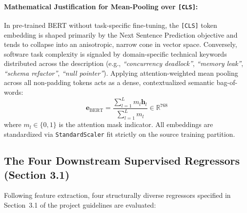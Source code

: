 \documentclass[11pt,a4paper]{article}
\begin{document}
\paragraph{Mathematical Justification for Mean-Pooling over \texttt{[CLS]}:}
In pre-trained BERT without task-specific fine-tuning, the \texttt{[CLS]} token embedding is shaped primarily by the Next Sentence Prediction objective and tends to collapse into an anisotropic, narrow cone in vector space. Conversely, software task complexity is signaled by domain-specific technical keywords distributed across the description (e.g., \textit{``concurrency deadlock''}, \textit{``memory leak''}, \textit{``schema refactor''}, \textit{``null pointer''}). Applying attention-weighted mean pooling across all non-padding tokens acts as a dense, contextualized semantic bag-of-words:
\begin{equation}
\mathbf{e}_{\text{BERT}} = \frac{\sum_{l=1}^{L} m_l \mathbf{h}_l}{\sum_{l=1}^{L} m_l} \in \mathbb{R}^{768}
\end{equation}
where $m_l \in \{0, 1\}$ is the attention mask indicator. All embeddings are standardized via \texttt{StandardScaler} fit strictly on the source training partition.

\subsection{The Four Downstream Supervised Regressors (Section 3.1)}
Following feature extraction, four structurally diverse regressors specified in Section~3.1 of the project guidelines are evaluated:
\end{document}
